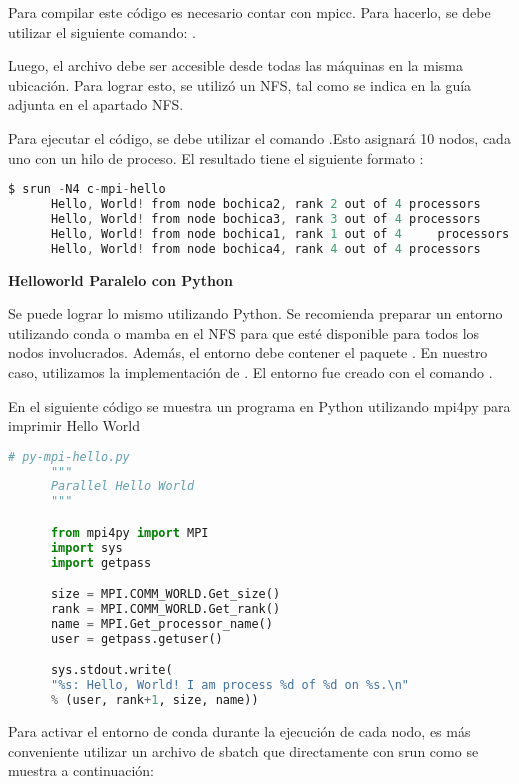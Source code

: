 \begin{spacing}{1.5}
  Para compilar este código es necesario contar con mpicc. Para hacerlo, se
  debe utilizar el siguiente comando: .

  Luego, el archivo debe ser accesible desde todas las máquinas en la misma
  ubicación. Para lograr esto, se utilizó un NFS, tal como se indica en la guía
  adjunta en el apartado NFS.

  Para ejecutar el código, se debe utilizar el comando .Esto asignará 10 nodos, cada uno con un hilo de proceso. El resultado tiene el siguiente formato :

    \begin{lstlisting}[language=C]
      $ srun -N4 c-mpi-hello
      Hello, World! from node bochica2, rank 2 out of 4 processors
      Hello, World! from node bochica3, rank 3 out of 4 processors
      Hello, World! from node bochica1, rank 1 out of 4     processors
      Hello, World! from node bochica4, rank 4 out of 4 processors
    \end{lstlisting}

  \textbf{Helloworld Paralelo con Python}

  Se puede lograr lo mismo utilizando Python. Se recomienda preparar un
  entorno utilizando conda o mamba en el NFS para que esté disponible para
  todos
  los nodos involucrados. Además, el entorno debe contener el paquete
  . En nuestro caso, utilizamos la implementación de .
  El entorno fue creado con el comando 
    .

    En el siguiente código se muestra un programa en Python utilizando mpi4py para imprimir Hello World

    \begin{lstlisting}[language=python]
      # py-mpi-hello.py
      """
      Parallel Hello World
      """

      from mpi4py import MPI
      import sys
      import getpass

      size = MPI.COMM_WORLD.Get_size()
      rank = MPI.COMM_WORLD.Get_rank()
      name = MPI.Get_processor_name()
      user = getpass.getuser()

      sys.stdout.write(
      "%s: Hello, World! I am process %d of %d on %s.\n"
      % (user, rank+1, size, name))

    \end{lstlisting}
      
    Para activar el entorno de conda durante la ejecución de cada nodo, es más conveniente utilizar un archivo de sbatch que directamente con srun como se muestra a continuación:


\end{spacing}
